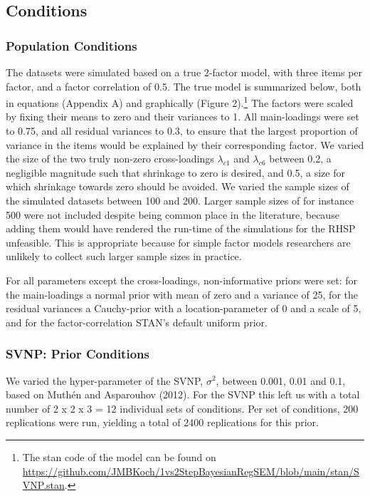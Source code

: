 \documentclass[
  man, donotrepeattitle,floatsintext]{apa6}
\begin{document}
\hypertarget{conditions}{%
\subsection{Conditions}\label{conditions}}

\hypertarget{population-conditions}{%
\subsubsection{Population Conditions}\label{population-conditions}}

The datasets were simulated based on a true 2-factor model, with three items per factor, and a factor correlation of 0.5. The true model is summarized below, both in equations (Appendix A) and graphically (Figure 2).\footnote{The stan code of the model can be found on \url{https://github.com/JMBKoch/1vs2StepBayesianRegSEM/blob/main/stan/SVNP.stan}.} The factors were scaled by fixing their means to zero and their variances to 1. All main-loadings were set to 0.75, and all residual variances to 0.3, to ensure that the largest proportion of variance in the items would be explained by their corresponding factor. We varied the size of the two truly non-zero cross-loadings \(\lambda_{c 1}\) and \(\lambda_{c 6}\) between 0.2, a negligible magnitude such that shrinkage to zero is desired, and 0.5, a size for which shrinkage towards zero should be avoided. We varied the sample sizes of the simulated datasets between 100 and 200. Larger sample sizes of for instance 500 were not included despite being common place in the literature, because adding them would have rendered the run-time of the simulations for the RHSP unfeasible. This is appropriate because for simple factor models researchers are unlikely to collect such larger sample sizes in practice.

For all parameters except the cross-loadings, non-informative priors were set: for the main-loadings a normal prior with mean of zero and a variance of 25, for the residual variances a Cauchy-prior with a location-parameter of 0 and a scale of 5, and for the factor-correlation STAN's default uniform prior.

\hypertarget{svnp-prior-conditions}{%
\subsubsection{SVNP: Prior Conditions}\label{svnp-prior-conditions}}

We varied the hyper-parameter of the SVNP, \(\sigma^2\), between 0.001, 0.01 and 0.1, based on Muthén and Asparouhov (2012). For the SVNP this left us with a total number of 2 x 2 x 3 = 12 individual sets of conditions. Per set of conditions, 200 replications were run, yielding a total of 2400 replications for this prior.
\end{document}

